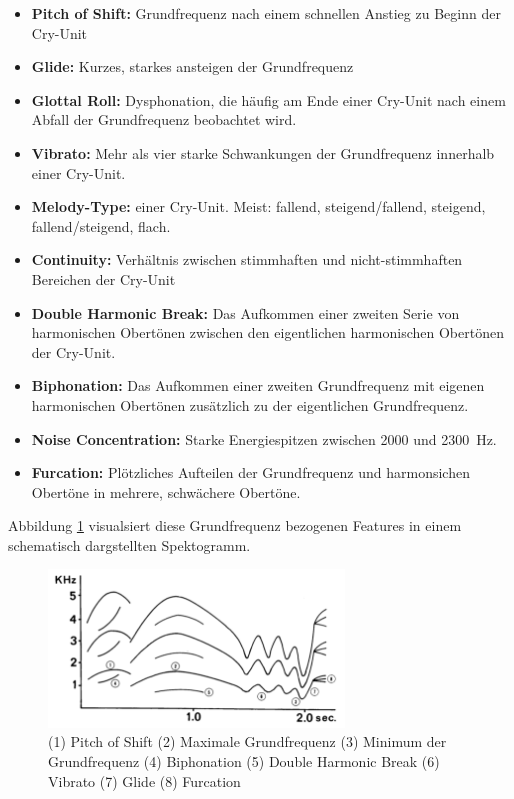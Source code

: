 \begin{itemize}
	\item \textbf{Pitch of Shift:} Grundfrequenz nach einem schnellen Anstieg zu Beginn der Cry-Unit
	\item \textbf{Glide:} Kurzes, starkes ansteigen der Grundfrequenz
	\item  \textbf{Glottal Roll:} Dysphonation, die häufig am Ende einer Cry-Unit nach einem Abfall der Grundfrequenz beobachtet wird.
	\item  \textbf{Vibrato:} Mehr als vier starke Schwankungen der Grundfrequenz innerhalb einer Cry-Unit.
	\item  \textbf{Melody-Type:} einer Cry-Unit. Meist: fallend, steigend/fallend, steigend, fallend/steigend, flach. 
	\item  \textbf{Continuity:} Verhältnis zwischen stimmhaften und nicht-stimmhaften Bereichen der Cry-Unit
	\item  \textbf{Double Harmonic Break:} Das Aufkommen einer zweiten Serie von harmonischen Obertönen zwischen den eigentlichen harmonischen Obertönen der Cry-Unit.
	\item  \textbf{Biphonation:} Das Aufkommen einer zweiten Grundfrequenz mit eigenen harmonischen Obertönen zusätzlich zu der eigentlichen Grundfrequenz.
	\item  \textbf{Noise Concentration:} Starke Energiespitzen zwischen 2000 und \SI{2300}{\hertz}.
	\item  \textbf{Furcation:} Plötzliches Aufteilen der Grundfrequenz und harmonsichen Obertöne in mehrere, schwächere Obertöne.
\end{itemize}

Abbildung \ref{img:cryMelodies} visualsiert diese Grundfrequenz bezogenen Features in einem schematisch dargstellten Spektogramm.

\begin{figure}
	\centering
	\includegraphics[width=0.7\textwidth]{bilder/melodyTypes.png}
	\caption{(1) Pitch of Shift (2) Maximale Grundfrequenz (3) Minimum der Grundfrequenz (4) Biphonation (5) Double Harmonic Break (6) Vibrato (7) Glide (8) Furcation \cite[S. 142]{signal}}
	\label{img:cryMelodies}
\end{figure}


